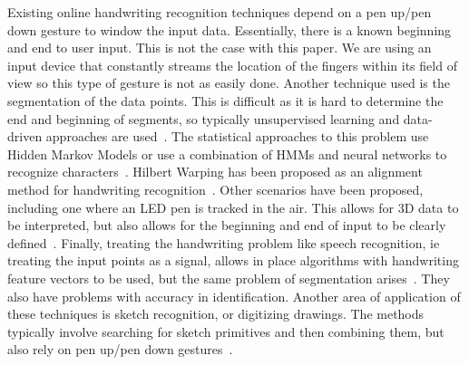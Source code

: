 Existing online handwriting recognition techniques depend on a pen up/pen down gesture to window the input data. Essentially, there is a known beginning and end to user input. This is not the case with this paper. We are using an input device that constantly streams the location of the fingers within its field of view so this type of gesture is not as easily done. Another technique used is the segmentation of the data points. This is difficult as it is hard to determine the end and beginning of segments, so typically unsupervised learning and data-driven approaches are used~\cite{plamondon2000online}. The statistical approaches to this problem use Hidden Markov Models or use a combination of HMMs and neural networks to recognize characters~\cite{plotz2009markov}. Hilbert Warping has been proposed as an alignment method for handwriting recognition~\cite{ishida2010hilbert}. Other scenarios have been proposed, including one where an LED pen is tracked in the air. This allows for 3D data to be interpreted, but also allows for the beginning and end of input to be clearly defined~\cite{asano2010visual}. Finally, treating the handwriting problem like speech recognition, ie treating the input points as a signal, allows in place algorithms with handwriting feature vectors to be used, but the same problem of segmentation arises~\cite{starner1994online}. They also have problems with accuracy in identification. 
Another area of application of these techniques is sketch recognition, or digitizing drawings. The methods typically involve searching for sketch primitives and then combining them, but also rely on pen up/pen down gestures~\cite{hammond2011recognizing}. 
